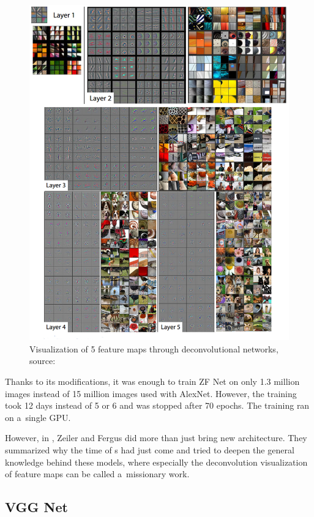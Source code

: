 \begin{figure}[H]
   \centering
	\includegraphics[width=\linewidth]{./pictures/deconvnet.png}
	\caption[Deconvolutional network]{Visualization of 5 feature maps through 
	deconvolutional networks, source: \cite{zf-net}}
      \label{fig:deconvnet}
\end{figure}

Thanks to its modifications, it was enough to train ZF Net on only 1.3 million 
images instead of 15 million images used with AlexNet. However, the training 
took 12 days instead of 5 or 6 and was stopped after 70 epochs. The training
ran on a~single GPU.

However, in \cite{zf-net}, Zeiler and Fergus did more than just bring new 
architecture. They summarized why the time of s had just come and tried
to deepen the general knowledge behind these models, where especially the 
deconvolution visualization of feature maps can be called a~missionary work.

\subsection{VGG Net}
\label{vgg}

